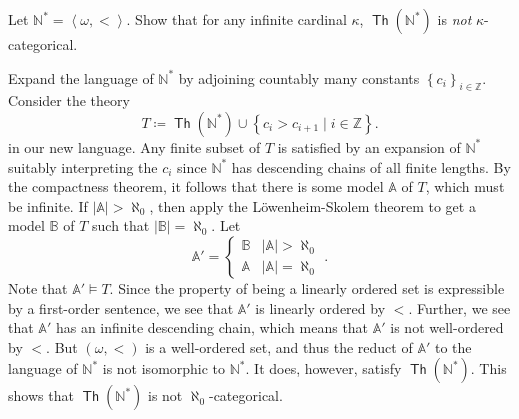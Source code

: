 \documentclass[10pt,letterpaper,cm]{nupset}
\theoremstyle{definition}
\theoremstyle{theorem}
\theoremstyle{remark}
\newcommand{\A}{\mathbb A}
\newcommand{\N}{\mathbb N}
\newcommand{\Z}{\mathbb Z}
\newcommand{\B}{\mathbb{B}}
\newcommand{\1}{\mathbb{1}}
\newcommand{\0}{\vec 0}
\DeclareMathOperator{\thh}{\mathsf{Th}}
\begin{document}
\begin{problem}[3.]
Let $\N^{\ast} = \left\langle \omega, <\right\rangle$. Show that for any infinite cardinal $\kappa$, $\thh(\N^{\ast})$ is \emph{not} $\kappa$-categorical.
\end{problem}
\begin{solution}
Expand the language of $\N^{\ast}$ by adjoining countably many constants $\left\{c_i\right\}_{i\in \Z}$. Consider the theory
\[ \label{eqn:st1}
T \coloneqq \thh(\N^{\ast}) \cup \left\{ c_i > c_{i+1} \mid i\in \Z \right\}. \tag{$\star$}
\] in our new language.  Any finite subset of $T$ is satisfied by an expansion of $\N^{\ast}$ suitably interpreting the $c_i$ since $\N^{\ast}$ has descending chains of all finite lengths. By the compactness theorem, it follows that there is some model $\A$ of $T$, which must be infinite. If $\left\lvert{\A}\right\rvert >\aleph_0$, then apply the L\"owenheim-Skolem theorem to get a model $\B$ of $T$ such that $\left\lvert{\B}\right\rvert = \aleph_0$.  Let 
\[
\A' = \begin{cases} \B & \left\lvert{\A}\right\rvert >\aleph_0
\\ \A & \left\lvert{\A}\right\rvert =\aleph_0
\end{cases}.
\] Note that $\A' \models T$. Since the property of being a linearly ordered set is expressible by a first-order sentence, we see that $\A'$ is linearly ordered by $<$. Further, we see that $\A'$ has an infinite descending chain, which means that $\A'$ is not well-ordered by $<$.  But $\left(\omega, <\right)$ is a well-ordered set, and thus the reduct of $\A'$ to the language of $\N^{\ast}$ is not isomorphic to $\N^{\ast}$. It does, however, satisfy $\thh(\N^{\ast})$. This shows that $\thh(\N^{\ast})$ is not $\aleph_0$-categorical.

\medskip


\end{solution}
\end{document}
